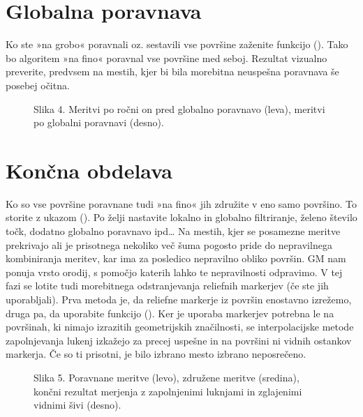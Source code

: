 \documentclass[letterpaper,10pt,english]{sphinxmanual}
\begin{document}
\section{Globalna poravnava}
\label{\detokenize{obdelava_3D_meritev:globalna-poravnava}}
\sphinxAtStartPar
Ko ste »na grobo« poravnali oz. sestavili vse površine zaženite funkcijo  (). Tako bo algoritem »na fino« poravnal vse površine med seboj. Rezultat vizualno preverite, predvsem na mestih, kjer bi bila morebitna neuspešna poravnava še posebej očitna.

\begin{figure}[htbp]
\centering
\capstart

\noindent{}
\caption{Slika 4. Meritvi po ročni on pred globalno poravnavo (leva), meritvi po globalni poravnavi (desno).}\label{\detokenize{obdelava_3D_meritev:id5}}\end{figure}


\section{Končna obdelava}
\label{\detokenize{obdelava_3D_meritev:koncna-obdelava}}
\sphinxAtStartPar
Ko so vse površine poravnane tudi »na fino« jih združite v eno samo površino. To storite z ukazom  (). Po želji nastavite lokalno in globalno filtriranje, želeno število točk, dodatno globalno poravnavo ipd…
Na mestih, kjer se posamezne meritve prekrivajo ali je prisotnega nekoliko več šuma pogosto pride do nepravilnega kombiniranja meritev, kar ima za posledico nepravilno obliko površin. GM nam ponuja vrsto orodij, s pomočjo katerih lahko te nepravilnosti odpravimo. V tej fazi se lotite tudi morebitnega odstranjevanja reliefnih markerjev (če ste jih uporabljali). Prva metoda je, da reliefne markerje iz površin enostavno izrežemo, druga pa, da uporabite funkcijo  (). Ker je uporaba markerjev potrebna le na površinah, ki nimajo izrazitih geometrijskih značilnosti, se interpolacijske metode zapolnjevanja lukenj izkažejo za precej uspešne in na površini ni vidnih ostankov markerja. Če so ti prisotni, je bilo izbrano mesto izbrano neposrečeno.

\begin{figure}[htbp]
\centering
\capstart

\noindent{}
\caption{Slika 5. Poravnane meritve (levo), združene meritve (sredina), končni rezultat merjenja z zapolnjenimi luknjami in zglajenimi vidnimi šivi (desno).}\label{\detokenize{obdelava_3D_meritev:id6}}\end{figure}
\end{document}
